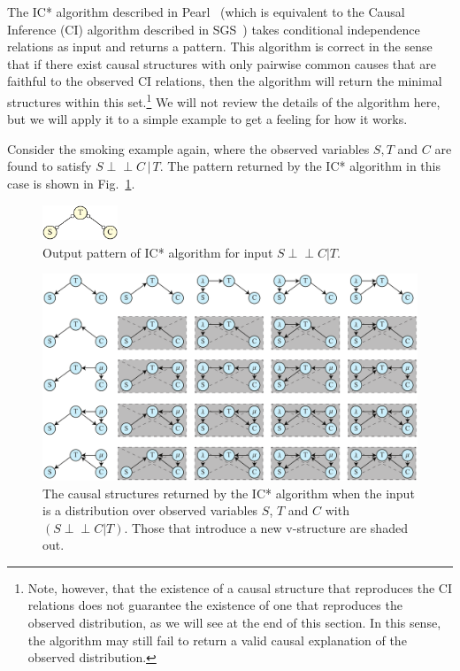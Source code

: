 \documentclass[letterpaper,onecolumn,nofootinbib]{revtex4}
\def\indep{\perp\!\!\!\!\perp}
\begin{document}
The IC* algorithm described in Pearl~\cite{Pearl2009} (which is equivalent to the Causal Inference (CI) algorithm described in SGS~\cite{Spirtes2001}) takes conditional independence relations as input and returns a pattern.  This algorithm is correct in the sense that if there exist causal structures with only pairwise common causes that are
faithful to the observed CI relations, then the algorithm will return the minimal structures within this set.\footnote{Note, however, that the existence of a causal structure that reproduces the CI relations does not guarantee the existence of one that reproduces the observed distribution, as we will see at the end of this section. In this sense, the algorithm may still fail to return a valid causal explanation of the observed distribution.}  We will not review the details of the algorithm here, but we will apply it to a simple example to get a feeling for how it works.

Consider the smoking example again, where the observed variables $S,T$ and $C$ are found to satisfy $S\indep C\,|\,T$. The pattern returned by the IC* algorithm in this case is shown in Fig.~\ref{fig:smokeICstar}.

\begin{figure}[ht]
	\centering
	\includegraphics[width=0.2\textwidth]{smoke-pattern}
 \caption{Output pattern of IC* algorithm for input $S \indep C|T$.}
       \label{fig:smokeICstar}
\end{figure}

\begin{figure}
	\centering
	\includegraphics[width=\textwidth]{smoke-ic-all}
 \caption{The causal structures returned by the IC* algorithm when the input is a distribution over observed variables $S$, $T$ and $C$ with $(S \indep C|T)$. Those that introduce a new v-structure are shaded out.}
       \label{fig:smoke-icstar-all}
\end{figure}
\end{document}
